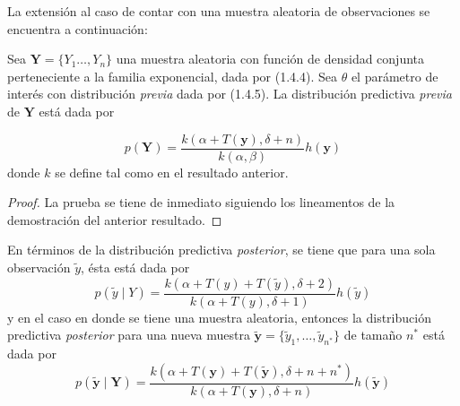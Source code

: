 \documentclass[10pt,openright]{book}\usepackage[]{graphicx}\usepackage[]{color}
\begin{document}
La extensión al caso de contar con una muestra aleatoria de observaciones se encuentra a continuación:

\begin{Res}
Sea $\mathbf{Y}=\{Y_1\ldots,Y_n\}$ una muestra aleatoria con función de densidad conjunta perteneciente a la familia exponencial, dada por (1.4.4). Sea $\theta$ el parámetro de interés con distribución \emph{previa} dada por (1.4.5). La distribución predictiva \emph{previa} de $\mathbf{Y}$ está dada por

\begin{equation}
p(\mathbf{Y})=\frac{k(\alpha+T(\mathbf{y}),\delta+n)}{k(\alpha,\beta)}h(\mathbf{y})
\end{equation}
donde $k$ se define tal como en el resultado anterior.
\end{Res}

\begin{proof}
La prueba se tiene de inmediato siguiendo los lineamentos de la demostración del anterior resultado.
\end{proof}

\begin{Res}
En términos de la distribución predictiva \emph{posterior}, se tiene que para una sola observación $\tilde{y}$, ésta está dada por
\begin{equation}
p(\tilde{y} \mid Y)=\frac{k(\alpha+T(y)+T(\tilde{y}),\delta+2)}{k(\alpha+T(y),\delta+1)}h(\tilde{y})
\end{equation}
y en el caso en donde se tiene una muestra aleatoria, entonces la distribución predictiva \emph{posterior} para una nueva muestra $\tilde{\mathbf{y}}=\{\tilde{y}_1,\ldots,\tilde{y}_{n^*}\}$ de tamaño $n^*$ está dada por
\begin{equation}
p(\tilde{\mathbf{y}} \mid \mathbf{Y})=
\frac{k(\alpha+T(\mathbf{y})+T(\tilde{\mathbf{y}}),\delta+n+n^*)}
{k(\alpha+T(\mathbf{y}),\delta+n)}h(\tilde{\mathbf{y}})
\end{equation}
\end{Res}
\end{document}
